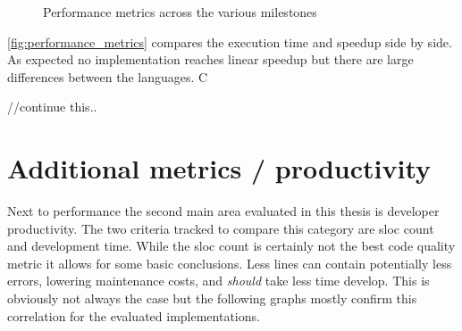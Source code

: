 \begin{figure}[htb]
{{
        }
    }
    \caption{Performance metrics across the various milestones}
    \label{fig:performance_metrics}
\end{figure}

\autoref{fig:performance_metrics} compares the execution time and speedup side by side. As expected no implementation reaches linear speedup but there are large differences between the languages. C 

//continue this..

\section{Additional metrics / productivity}
\label{sec:Evaluation::Metrics}

Next to performance the second main area evaluated in this thesis is developer productivity. The two criteria tracked to compare this category are \gls{sloc} count and development time. While the \gls{sloc} count is certainly not the best code quality metric it allows for some basic conclusions. Less lines can contain potentially less errors, lowering maintenance costs, and \textit{should} take less time develop. This is obviously not always the case but the following graphs mostly confirm this correlation for the evaluated implementations.

